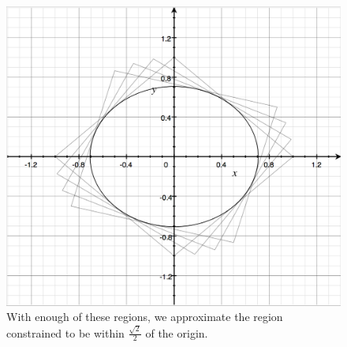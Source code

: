 \begin{figure} 
\includegraphics[scale=0.4]{dist3.png}
\caption{With enough of these regions, we approximate the region constrained to be within $\frac{\sqrt{2}}{2}$ of the origin.}
\label{dist3}
\end{figure}

